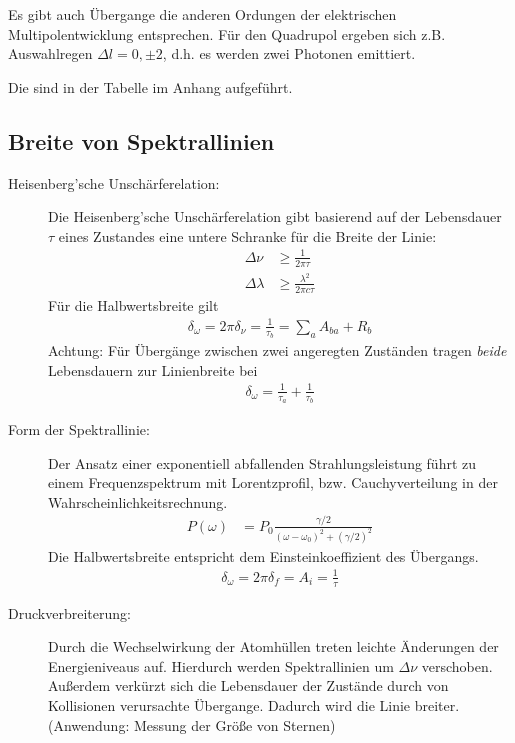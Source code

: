 \documentclass[twocolumn]{summery_4.1}
\begin{document}
Es gibt auch Übergange die anderen Ordungen der elektrischen Multipolentwicklung entsprechen.
Für den Quadrupol ergeben sich z.B. Auswahlregen \(\Delta l=0,\pm2\), d.h. es werden zwei Photonen emittiert.

Die  sind in der Tabelle im Anhang aufgeführt.

\subsection{Breite von Spektrallinien}
\begin{description}
    \item[Heisenberg'sche Unschärferelation:]
    Die Heisenberg'sche Unschärferelation gibt basierend auf der Lebensdauer \(\tau\) eines Zustandes eine untere Schranke für die Breite der Linie:
    \begin{align*}
        \Delta \nu &\ge \frac{1}{2 \pi \tau}\\
        \Delta \lambda &\ge \frac{\lambda^2}{2\pi c \tau }
    \end{align*} 
    Für die Halbwertsbreite gilt 
    \begin{align*}
        \delta_\omega = 2\pi \delta_\nu = \frac{1}{\tau_b} = \sum_a A_{ba} + R_b
    \end{align*}
    Achtung: Für Übergänge zwischen zwei angeregten Zuständen tragen \emph{beide} Lebensdauern zur Linienbreite bei 
    \begin{align*}
        \delta_\omega = \frac1{\tau_a} + \frac1{\tau_b}
    \end{align*}
    \item[Form der Spektrallinie:]
    Der Ansatz einer exponentiell abfallenden Strahlungsleistung führt zu einem Frequenzspektrum mit Lorentzprofil, bzw. Cauchyverteilung in der Wahrscheinlichkeitsrechnung.
    \begin{align*}
        P(\omega) &= P_0 \frac{\gamma/2}{(\omega-\omega_0)^2 + (\gamma/2)^2} 
    \end{align*}
    Die Halbwertsbreite entspricht dem Einsteinkoeffizient des Übergangs.
    \begin{align*}
        \delta_\omega = 2\pi \delta_f = A_i = \frac1\tau
    \end{align*}
    \item[Druckverbreiterung:]
    Durch die Wechselwirkung der Atomhüllen treten leichte Änderungen der Energieniveaus auf. Hierdurch werden Spektrallinien um $\Delta \nu$ verschoben. Außerdem verkürzt sich die Lebensdauer der Zustände durch von Kollisionen verursachte Übergange. Dadurch wird die Linie breiter. (Anwendung: Messung der Größe von Sternen)

\end{description}
\end{document}
